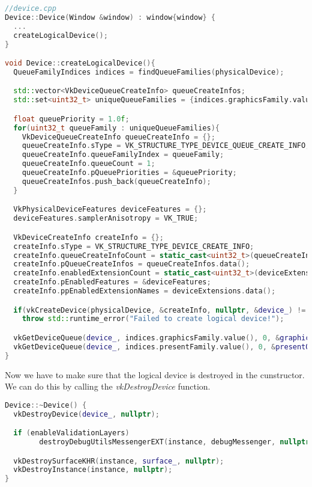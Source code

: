 \documentclass[12pt]{report} \usepackage{preamble}
\begin{document}
\begin{lstlisting}[language=C++]
//device.cpp
Device::Device(Window &window) : window{window} {
  ...
  createLogicalDevice();
}

void Device::createLogicalDevice(){
  QueueFamilyIndices indices = findQueueFamilies(physicalDevice);

  std::vector<VkDeviceQueueCreateInfo> queueCreateInfos;
  std::set<uint32_t> uniqueQueueFamilies = {indices.graphicsFamily.value(), indices.presentFamily.value()};

  float queuePriority = 1.0f;
  for(uint32_t queueFamily : uniqueQueueFamilies){
    VkDeviceQueueCreateInfo queueCreateInfo = {};
    queueCreateInfo.sType = VK_STRUCTURE_TYPE_DEVICE_QUEUE_CREATE_INFO;
    queueCreateInfo.queueFamilyIndex = queueFamily;
    queueCreateInfo.queueCount = 1;
    queueCreateInfo.pQueuePriorities = &queuePriority;
    queueCreateInfos.push_back(queueCreateInfo);
  }

  VkPhysicalDeviceFeatures deviceFeatures = {};
  deviceFeatures.samplerAnisotropy = VK_TRUE;

  VkDeviceCreateInfo createInfo = {};
  createInfo.sType = VK_STRUCTURE_TYPE_DEVICE_CREATE_INFO;
  createInfo.queueCreateInfoCount = static_cast<uint32_t>(queueCreateInfos.size());
  createInfo.pQueueCreateInfos = queueCreateInfos.data();
  createInfo.enabledExtensionCount = static_cast<uint32_t>(deviceExtensions.size());
  createInfo.pEnabledFeatures = &deviceFeatures;
  createInfo.ppEnabledExtensionNames = deviceExtensions.data();

  if(vkCreateDevice(physicalDevice, &createInfo, nullptr, &device_) != VK_SUCCESS)
    throw std::runtime_error("Failed to create logical device!");

  vkGetDeviceQueue(device_, indices.graphicsFamily.value(), 0, &graphicsQueue_);
  vkGetDeviceQueue(device_, indices.presentFamily.value(), 0, &presentQueue_);
}
\end{lstlisting}

Now we have to make sure that the logical device is destroyed in the cunstructor.
We can do this by calling the \textit{vkDestroyDevice} function.

\begin{lstlisting}[language=C++]
Device::~Device() {
  vkDestroyDevice(device_, nullptr);

  if (enableValidationLayers)
		destroyDebugUtilsMessengerEXT(instance, debugMessenger, nullptr);

  vkDestroySurfaceKHR(instance, surface_, nullptr);
  vkDestroyInstance(instance, nullptr);
}
\end{lstlisting}
\end{document}
